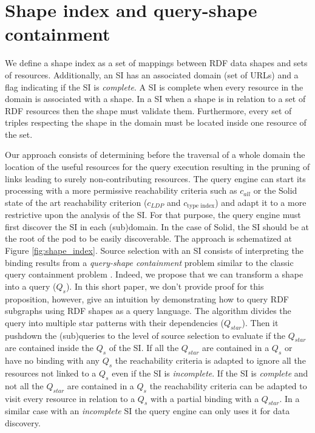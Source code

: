 \section{Shape index and query-shape containment}

We define a shape index as a set of mappings between RDF data shapes and sets of resources.
Additionally, an SI has an associated domain (set of URLs)
and a flag indicating if the SI is \emph{complete}.
A SI is complete when every resource in the domain is associated with a shape.
In a SI when a shape is in relation to a set of RDF resources then the shape must validate them.
Furthermore, every set of triples respecting the shape in the domain must be located inside one resource of the set.

Our approach consists of determining before the traversal of a whole domain the location of the useful resources for the query execution
resulting in the pruning of links leading to surely non-contributing resources.
The query engine can start its processing with a more permissive reachability criteria
such as $c_{all}$ \cite{Hartig2012} or the Solid state of the art reachability criterion ($c_{LDP}$ and $c_{\text{type index}}$) \cite{Taelman2023}
and adapt it to a more restrictive upon the analysis of the SI.
For that purpose, the query engine must first discover the SI in each (sub)domain.
In the case of Solid, the SI should be at the root of the pod to be easily discoverable.
The approach is schematized at Figure \ref{fig:shape_index}.
Source selection with an SI consists of interpreting the binding results from a \emph{query-shape containment} problem similar to the classic query containment problem \cite{afariQCE, Spasi2023}.
Indeed, we propose that we can transform a shape into a query ($Q_{s}$).
In this short paper, we don't provide proof for this proposition, however, 
\citeauthor{Delva2021} give an intuition by demonstrating how to query RDF subgraphs using RDF shapes as a query language.
The algorithm divides the query into multiple star patterns with their dependencies ($Q_{star}$).
Then it pushdown \cite{Yang2021FlexPushdownDBHP} the (sub)queries to the level of source selection to evaluate if the $Q_{star}$ are contained inside the $Q_s$ of the SI.
If all the $Q_{star}$ are contained in a $Q_{s}$ or have no binding with any $Q_{s}$
the reachability criteria is adapted to ignore all the resources not linked to a $Q_{s}$ even if the SI is \emph{incomplete}.
If the SI is \emph{complete} and not all the $Q_{star}$ are contained in a $Q_{s}$ the reachability criteria can be adapted
to visit every resource in relation to a $Q_{s}$ with a partial binding with a $Q_{star}$.
In a similar case with an \emph{incomplete} SI the query engine can only uses it for data discovery.

